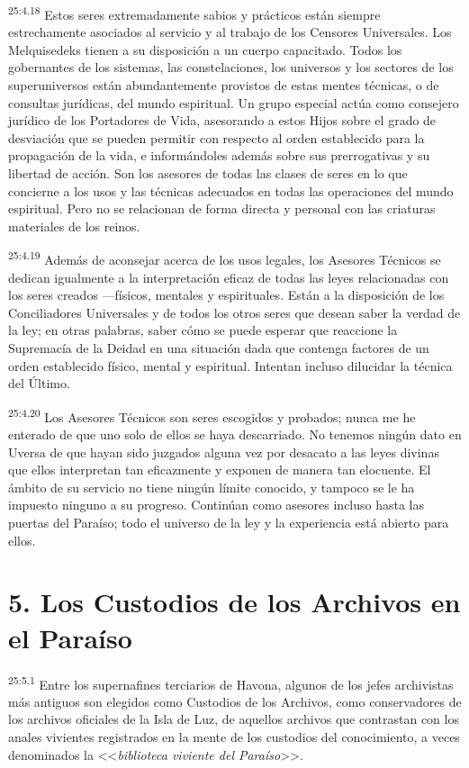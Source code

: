 \par
\textsuperscript{25:4.18} Estos seres extremadamente sabios y prácticos están siempre estrechamente asociados al servicio y al trabajo de los Censores Universales. Los Melquisedeks tienen a su disposición a un cuerpo capacitado. Todos los gobernantes de los sistemas, las constelaciones, los universos y los sectores de los superuniversos están abundantemente provistos de estas mentes técnicas, o de consultas jurídicas, del mundo espiritual. Un grupo especial actúa como consejero jurídico de los Portadores de Vida, asesorando a estos Hijos sobre el grado de desviación que se pueden permitir con respecto al orden establecido para la propagación de la vida, e informándoles además sobre sus prerrogativas y su libertad de acción. Son los asesores de todas las clases de seres en lo que concierne a los usos y las técnicas adecuados en todas las operaciones del mundo espiritual. Pero no se relacionan de forma directa y personal con las criaturas materiales de los reinos.

\par
\textsuperscript{25:4.19} Además de aconsejar acerca de los usos legales, los Asesores Técnicos se dedican igualmente a la interpretación eficaz de todas las leyes relacionadas con los seres creados ---físicos, mentales y espirituales. Están a la disposición de los Conciliadores Universales y de todos los otros seres que desean saber la verdad de la ley; en otras palabras, saber cómo se puede esperar que reaccione la Supremacía de la Deidad en una situación dada que contenga factores de un orden establecido físico, mental y espiritual. Intentan incluso dilucidar la técnica del Último.

\par
\textsuperscript{25:4.20} Los Asesores Técnicos son seres escogidos y probados; nunca me he enterado de que uno solo de ellos se haya descarriado. No tenemos ningún dato en Uversa de que hayan sido juzgados alguna vez por desacato a las leyes divinas que ellos interpretan tan eficazmente y exponen de manera tan elocuente. El ámbito de su servicio no tiene ningún límite conocido, y tampoco se le ha impuesto ninguno a su progreso. Continúan como asesores incluso hasta las puertas del Paraíso; todo el universo de la ley y la experiencia está abierto para ellos.

\section*{5. Los Custodios de los Archivos en el Paraíso}
\par
\textsuperscript{25:5.1} Entre los supernafines terciarios de Havona, algunos de los jefes archivistas más antiguos son elegidos como Custodios de los Archivos, como conservadores de los archivos oficiales de la Isla de Luz, de aquellos archivos que contrastan con los anales vivientes registrados en la mente de los custodios del conocimiento, a veces denominados la <<\textit{biblioteca viviente del Paraíso}>>.

